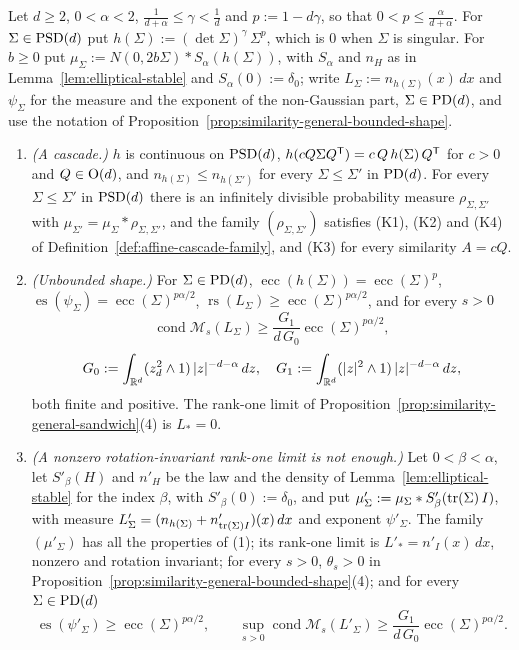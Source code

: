 \begin{proposition}\label{prop:similarity-degenerate-family}
Let $d \ge 2$, $0 < \alpha < 2$, $\tfrac{1}{d+\alpha} \le \gamma < \tfrac1d$ and $p := 1 - d\gamma$, so that
$0 < p \le \tfrac{\alpha}{d+\alpha}$. For $\Sigma \in \mathrm{PSD}(d)$ put $h(\Sigma) := (\det\Sigma)^\gamma\,\Sigma^p$,
which is $0$ when $\Sigma$ is singular. For $b \ge 0$ put
$\mu_\Sigma := N(0,2b\Sigma) * S_\alpha(h(\Sigma))$, with $S_\alpha$ and $n_H$ as in
Lemma~\ref{lem:elliptical-stable} and $S_\alpha(0) := \delta_0$; write $L_\Sigma := n_{h(\Sigma)}(x)\,dx$ and
$\psi_\Sigma$ for the \Levy{} measure and the exponent of the non-Gaussian part, $\Sigma \in \mathrm{PD}(d)$, and
use the notation of Proposition~\ref{prop:similarity-general-bounded-shape}.
\begin{enumerate}
\item \emph{(A cascade.)} $h$ is continuous on $\mathrm{PSD}(d)$, $h(cQ\Sigma Q^{\mathsf{T}}) = c\,Q\,h(\Sigma)\,Q^{\mathsf{T}}$ for
$c > 0$ and $Q \in \mathrm{O}(d)$, and $n_{h(\Sigma)} \le n_{h(\Sigma')}$ for every $\Sigma \le \Sigma'$ in $\mathrm{PD}(d)$.
For every $\Sigma \le \Sigma'$ in $\mathrm{PSD}(d)$ there is an infinitely divisible probability measure
$\rho_{\Sigma,\Sigma'}$ with $\mu_{\Sigma'} = \mu_\Sigma * \rho_{\Sigma,\Sigma'}$, and the family
$(\rho_{\Sigma,\Sigma'})$ satisfies (K1), (K2) and (K4) of Definition~\ref{def:affine-cascade-family}, and (K3) for
every similarity $A = cQ$.
\item \emph{(Unbounded shape.)} For $\Sigma \in \mathrm{PD}(d)$, $\operatorname{ecc}(h(\Sigma)) = \operatorname{ecc}(\Sigma)^p$,
$\operatorname{es}(\psi_\Sigma) = \operatorname{ecc}(\Sigma)^{p\alpha/2}$, $\operatorname{rs}(L_\Sigma) \ge \operatorname{ecc}(\Sigma)^{p\alpha/2}$, and for
every $s > 0$
\[
  \operatorname{cond}\mathcal M_s(L_\Sigma) \ge \frac{G_1}{d\,G_0}\operatorname{ecc}(\Sigma)^{p\alpha/2} ,
\]
\[
  G_0 := \int_{\mathbb{R}^d}(z_d^2 \wedge 1)\,|z|^{-d-\alpha}\,dz ,
  \quad
  G_1 := \int_{\mathbb{R}^d}(|z|^2 \wedge 1)\,|z|^{-d-\alpha}\,dz ,
\]
both finite and positive. The rank-one limit of Proposition~\ref{prop:similarity-general-sandwich}(4) is $L_* = 0$.
\item \emph{(A nonzero rotation-invariant rank-one limit is not enough.)} Let $0 < \beta < \alpha$, let
$S'_\beta(H)$ and $n'_H$ be the law and the \Levy{} density of Lemma~\ref{lem:elliptical-stable} for the index
$\beta$, with $S'_\beta(0) := \delta_0$, and put $\mu'_\Sigma := \mu_\Sigma * S'_\beta(\operatorname{tr}(\Sigma)\,I)$, with \Levy{} measure
$L'_\Sigma = (n_{h(\Sigma)} + n'_{\operatorname{tr}(\Sigma)I})(x)\,dx$ and exponent $\psi'_\Sigma$. The family $(\mu'_\Sigma)$
has all the properties of (1); its rank-one limit is $L'_* = n'_I(x)\,dx$, nonzero and rotation
invariant; for every $s > 0$, $\theta_s > 0$ in Proposition~\ref{prop:similarity-general-bounded-shape}(4); and for
every $\Sigma \in \mathrm{PD}(d)$
\[
  \operatorname{es}(\psi'_\Sigma) \ge \operatorname{ecc}(\Sigma)^{p\alpha/2} ,
  \qquad
  \sup_{s>0}\operatorname{cond}\mathcal M_s(L'_\Sigma) \ge \frac{G_1}{d\,G_0}\operatorname{ecc}(\Sigma)^{p\alpha/2} .
\]
\end{enumerate}
\end{proposition}

